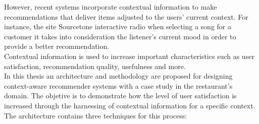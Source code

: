 However, recent systems incorporate contextual
information to make recommendations that deliver items adjusted
to the users' current context. For instance, the site Sourcetone %
interactive radio \cite{huq2010automated} when selecting a song for
a customer it takes into consideration the listener's current mood in
order to provide a better recommendation. \\ Contextual information is used to
increase important characteristics such as user satisfaction, recommendation 
quality, usefulness and more.\\
In this thesis an architecture and methodology are proposed for designing context-aware
recommender systems with a case study in the restaurant's domain. The objetive is to
demonstrate how the level of user satisfaction is increased through
the harnessing of contextual information for  a specific
context. The architecture contains three techniques for this process:

